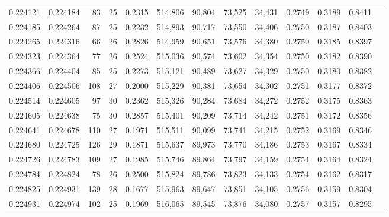 \begin{tabular}{rrrrrrrrrrrrr}
0.224121 & 0.224184 &  83 &  25 &                                     0.2315 & 514,806 &  90,804 &  73,525 &  34,431 & 0.2749 & 0.3189 & 0.8411 \\
0.224185 & 0.224264 &  87 &  25 &                                     0.2232 & 514,893 &  90,717 &  73,550 &  34,406 & 0.2750 & 0.3187 & 0.8403 \\
0.224265 & 0.224316 &  66 &  26 &                                     0.2826 & 514,959 &  90,651 &  73,576 &  34,380 & 0.2750 & 0.3185 & 0.8397 \\
0.224323 & 0.224364 &  77 &  26 &                                     0.2524 & 515,036 &  90,574 &  73,602 &  34,354 & 0.2750 & 0.3182 & 0.8390 \\
0.224366 & 0.224404 &  85 &  25 &                                     0.2273 & 515,121 &  90,489 &  73,627 &  34,329 & 0.2750 & 0.3180 & 0.8382 \\
0.224406 & 0.224506 & 108 &  27 &                                     0.2000 & 515,229 &  90,381 &  73,654 &  34,302 & 0.2751 & 0.3177 & 0.8372 \\
0.224514 & 0.224605 &  97 &  30 &                                     0.2362 & 515,326 &  90,284 &  73,684 &  34,272 & 0.2752 & 0.3175 & 0.8363 \\
0.224605 & 0.224638 &  75 &  30 &                                     0.2857 & 515,401 &  90,209 &  73,714 &  34,242 & 0.2751 & 0.3172 & 0.8356 \\
0.224641 & 0.224678 & 110 &  27 &                                     0.1971 & 515,511 &  90,099 &  73,741 &  34,215 & 0.2752 & 0.3169 & 0.8346 \\
0.224680 & 0.224725 & 126 &  29 &                                     0.1871 & 515,637 &  89,973 &  73,770 &  34,186 & 0.2753 & 0.3167 & 0.8334 \\
0.224726 & 0.224783 & 109 &  27 &                                     0.1985 & 515,746 &  89,864 &  73,797 &  34,159 & 0.2754 & 0.3164 & 0.8324 \\
0.224784 & 0.224824 &  78 &  26 &                                     0.2500 & 515,824 &  89,786 &  73,823 &  34,133 & 0.2754 & 0.3162 & 0.8317 \\
0.224825 & 0.224931 & 139 &  28 &                                     0.1677 & 515,963 &  89,647 &  73,851 &  34,105 & 0.2756 & 0.3159 & 0.8304 \\
0.224931 & 0.224974 & 102 &  25 &                                     0.1969 & 516,065 &  89,545 &  73,876 &  34,080 & 0.2757 & 0.3157 & 0.8295 \\

\end{tabular}
